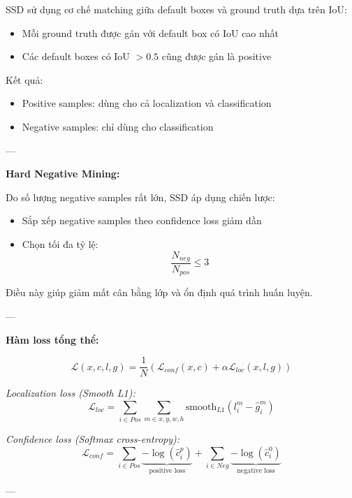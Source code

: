 SSD sử dụng cơ chế matching giữa default boxes và ground truth dựa trên IoU:

\begin{itemize}
	\item Mỗi ground truth được gán với default box có IoU cao nhất
	\item Các default boxes có IoU $> 0.5$ cũng được gán là positive
\end{itemize}

Kết quả:
\begin{itemize}
	\item Positive samples: dùng cho cả localization và classification
	\item Negative samples: chỉ dùng cho classification
\end{itemize}

---

\textbf{Hard Negative Mining:}

Do số lượng negative samples rất lớn, SSD áp dụng chiến lược:

\begin{itemize}
	\item Sắp xếp negative samples theo confidence loss giảm dần
	\item Chọn tối đa tỷ lệ:
	\[
	\frac{N_{neg}}{N_{pos}} \leq 3
	\]
\end{itemize}

Điều này giúp giảm mất cân bằng lớp và ổn định quá trình huấn luyện.

---

\textbf{Hàm loss tổng thể:}

\begin{equation}
	\mathcal{L}(x, c, l, g) = \frac{1}{N} \left( \mathcal{L}_{conf}(x, c) + \alpha \mathcal{L}_{loc}(x, l, g) \right)
\end{equation}

\textit{Localization loss (Smooth L1):}
\begin{equation}
	\mathcal{L}_{loc} = \sum_{i \in Pos} \sum_{m \in {x,y,w,h}}
	\text{smooth}_{L1}(l_i^m - \hat{g}_i^m)
\end{equation}

\textit{Confidence loss (Softmax cross-entropy):}
\begin{equation}
	\mathcal{L}_{conf} = \sum_{i \in Pos} \underbrace{-\log(\hat{c}_i^{p})}_{\text{positive loss}}
	+ \sum_{i \in Neg} \underbrace{-\log(\hat{c}_i^{0})}_{\text{negative loss}}
\end{equation}

---

